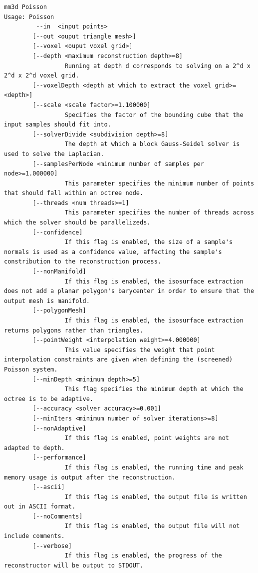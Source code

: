\begin{verbatim}   
mm3d Poisson
Usage: Poisson
         --in  <input points>
        [--out <ouput triangle mesh>]
        [--voxel <ouput voxel grid>]
        [--depth <maximum reconstruction depth>=8]
                 Running at depth d corresponds to solving on a 2^d x 2^d x 2^d voxel grid.
        [--voxelDepth <depth at which to extract the voxel grid>=<depth>]
        [--scale <scale factor>=1.100000]
                 Specifies the factor of the bounding cube that the input samples should fit into.
        [--solverDivide <subdivision depth>=8]
                 The depth at which a block Gauss-Seidel solver is used to solve the Laplacian.
        [--samplesPerNode <minimum number of samples per node>=1.000000]
                 This parameter specifies the minimum number of points that should fall within an octree node.
        [--threads <num threads>=1]
                 This parameter specifies the number of threads across which the solver should be parallelizeds.
        [--confidence]
                 If this flag is enabled, the size of a sample's normals is used as a confidence value, affecting the sample's constribution to the reconstruction process.
        [--nonManifold]
                 If this flag is enabled, the isosurface extraction does not add a planar polygon's barycenter in order to ensure that the output mesh is manifold.
        [--polygonMesh]
                 If this flag is enabled, the isosurface extraction returns polygons rather than triangles.
        [--pointWeight <interpolation weight>=4.000000]
                 This value specifies the weight that point interpolation constraints are given when defining the (screened) Poisson system.
        [--minDepth <minimum depth>=5]
                 This flag specifies the minimum depth at which the octree is to be adaptive.
        [--accuracy <solver accuracy>=0.001]
        [--minIters <minimum number of solver iterations>=8]
        [--nonAdaptive]
                 If this flag is enabled, point weights are not adapted to depth.
        [--performance]
                 If this flag is enabled, the running time and peak memory usage is output after the reconstruction.
        [--ascii]
                 If this flag is enabled, the output file is written out in ASCII format.
        [--noComments]
                 If this flag is enabled, the output file will not include comments.
        [--verbose]
                 If this flag is enabled, the progress of the reconstructor will be output to STDOUT.
\end{verbatim}

